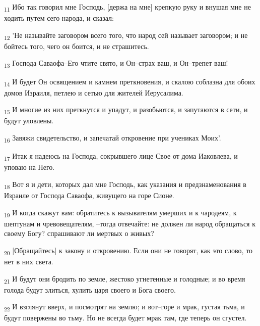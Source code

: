 \begin{tcolorbox}
\textsubscript{11} Ибо так говорил мне Господь, [держа на мне] крепкую руку и внушая мне не ходить путем сего народа, и сказал:
\end{tcolorbox}
\begin{tcolorbox}
\textsubscript{12} 'Не называйте заговором всего того, что народ сей называет заговором; и не бойтесь того, чего он боится, и не страшитесь.
\end{tcolorbox}
\begin{tcolorbox}
\textsubscript{13} Господа Саваофа--Его чтите свято, и Он--страх ваш, и Он--трепет ваш!
\end{tcolorbox}
\begin{tcolorbox}
\textsubscript{14} И будет Он освящением и камнем преткновения, и скалою соблазна для обоих домов Израиля, петлею и сетью для жителей Иерусалима.
\end{tcolorbox}
\begin{tcolorbox}
\textsubscript{15} И многие из них преткнутся и упадут, и разобьются, и запутаются в сети, и будут уловлены.
\end{tcolorbox}
\begin{tcolorbox}
\textsubscript{16} Завяжи свидетельство, и запечатай откровение при учениках Моих'.
\end{tcolorbox}
\begin{tcolorbox}
\textsubscript{17} Итак я надеюсь на Господа, сокрывшего лице Свое от дома Иаковлева, и уповаю на Него.
\end{tcolorbox}
\begin{tcolorbox}
\textsubscript{18} Вот я и дети, которых дал мне Господь, как указания и предзнаменования в Израиле от Господа Саваофа, живущего на горе Сионе.
\end{tcolorbox}
\begin{tcolorbox}
\textsubscript{19} И когда скажут вам: обратитесь к вызывателям умерших и к чародеям, к шептунам и чревовещателям, --тогда отвечайте: не должен ли народ обращаться к своему Богу? спрашивают ли мертвых о живых?
\end{tcolorbox}
\begin{tcolorbox}
\textsubscript{20} [Обращайтесь] к закону и откровению. Если они не говорят, как это слово, то нет в них света.
\end{tcolorbox}
\begin{tcolorbox}
\textsubscript{21} И будут они бродить по земле, жестоко угнетенные и голодные; и во время голода будут злиться, хулить царя своего и Бога своего.
\end{tcolorbox}
\begin{tcolorbox}
\textsubscript{22} И взглянут вверх, и посмотрят на землю; и вот--горе и мрак, густая тьма, и будут повержены во тьму. Но не всегда будет мрак там, где теперь он сгустел.
\end{tcolorbox}
